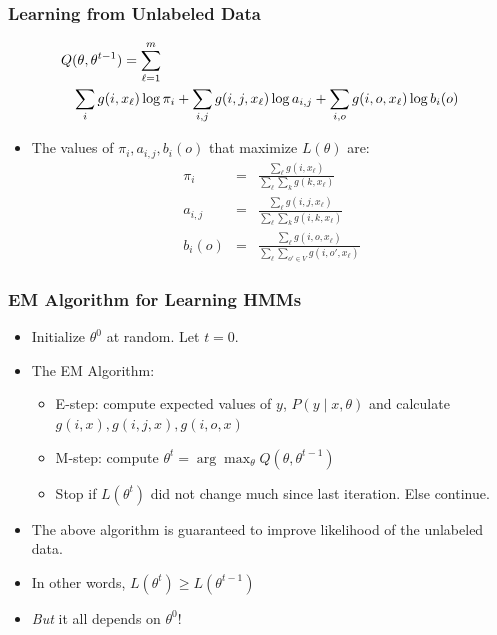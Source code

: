 \begin{frame}
\frametitle{Learning from Unlabeled Data}
{\small\begin{eqnarray*}
\lefteqn{Q(\theta,\theta^{t-1}) = \sum_{\ell=1}^m  } \\
&& \sum_i g(i,x_\ell) \log \pi_i + \sum_{i,j} g(i,j,x_\ell) \log a_{i,j} + \sum_{i,o} g(i,o,x_\ell) \log b_i(o) \end{eqnarray*}}
\begin{itemize}[<+->]
\item The values of $\pi_i, a_{i,j}, b_i(o)$ that maximize $L(\theta)$ are:
\begin{eqnarray*}
\pi_i & = & \frac{\sum_\ell g(i,x_\ell)}{\sum_\ell \sum_k g(k,x_\ell)} \\
a_{i,j} & = & \frac{\sum_\ell g(i,j,x_\ell)}{\sum_\ell \sum_k g(i,k,x_\ell)} \\
b_i(o) & = & \frac{\sum_\ell g(i,o,x_\ell)}{\sum_\ell \sum_{o' \in V} g(i,o',x_\ell)} 
\end{eqnarray*}
\end{itemize}
\end{frame}

\begin{frame}
\frametitle{EM Algorithm for Learning HMMs}
\begin{itemize}[<+->]
\item Initialize $\theta^0$ at random. Let $t=0$.
\item The EM Algorithm:
\begin{itemize}[<+->]
\item E-step: compute expected values of $y$, $P(y \mid x, \theta)$ and calculate $g(i,x), g(i,j,x), g(i,o,x)$
\item M-step: compute $\theta^{t} = \arg\max_\theta Q(\theta, \theta^{t-1})$
\item Stop if $L(\theta^t)$ did not change much since last iteration. Else continue.
\end{itemize}
\item The above algorithm is guaranteed to improve likelihood of the unlabeled data.
\item In other words, $L(\theta^t) \geq L(\theta^{t-1})$
\item \emph{But} it all depends on $\theta^0$!
\end{itemize}
\end{frame}





